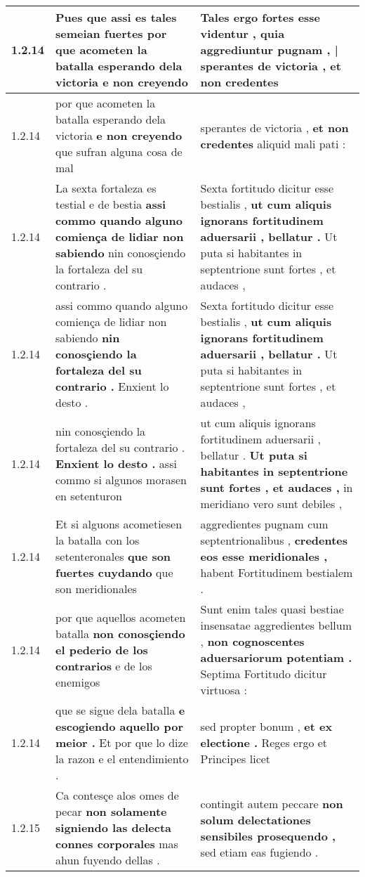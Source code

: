 \begin{tabular}{|p{1cm}|p{6.5cm}|p{6.5cm}|}
1.2.14 & Pues que assi es tales semeian fuertes \textbf{ por que acometen la batalla esperando dela victoria } e non creyendo & Tales ergo fortes esse videntur , \textbf{ quia aggrediuntur pugnam , | sperantes de victoria , } et non credentes \\\hline
1.2.14 & por que acometen la batalla esperando dela victoria \textbf{ e non creyendo } que sufran alguna cosa de mal & sperantes de victoria , \textbf{ et non credentes } aliquid mali pati : \\\hline
1.2.14 & La sexta fortaleza es testial e de bestia \textbf{ assi commo quando alguno comiença de lidiar non sabiendo } nin conosçiendo la fortaleza del su contrario . & Sexta fortitudo dicitur esse bestialis , \textbf{ ut cum aliquis ignorans fortitudinem aduersarii , bellatur . } Ut puta si habitantes in septentrione sunt fortes , et audaces , \\\hline
1.2.14 & assi commo quando alguno comiença de lidiar non sabiendo \textbf{ nin conosçiendo la fortaleza del su contrario . } Enxient lo desto . & Sexta fortitudo dicitur esse bestialis , \textbf{ ut cum aliquis ignorans fortitudinem aduersarii , bellatur . } Ut puta si habitantes in septentrione sunt fortes , et audaces , \\\hline
1.2.14 & nin conosçiendo la fortaleza del su contrario . \textbf{ Enxient lo desto . } assi commo si algunos morasen en setenturon & ut cum aliquis ignorans fortitudinem aduersarii , bellatur . \textbf{ Ut puta si habitantes in septentrione sunt fortes , et audaces , } in meridiano vero sunt debiles , \\\hline
1.2.14 & Et si alguons acometiesen la batalla con los setenteronales \textbf{ que son fuertes cuydando } que son meridionales & aggredientes pugnam cum septentrionalibus , \textbf{ credentes eos esse meridionales , } habent Fortitudinem bestialem . \\\hline
1.2.14 & por que aquellos acometen batalla \textbf{ non conosçiendo el pederio de los contrarios } e de los enemigos & Sunt enim tales quasi bestiae insensatae aggredientes bellum , \textbf{ non cognoscentes aduersariorum potentiam . } Septima Fortitudo dicitur virtuosa : \\\hline
1.2.14 & que se sigue dela batalla \textbf{ e escogiendo aquello por meior . } Et por que lo dize la razon e el entendimiento . & sed propter bonum , \textbf{ et ex electione . } Reges ergo et Principes licet \\\hline
1.2.15 & Ca contesçe alos omes de pecar \textbf{ non solamente signiendo las delecta connes corporales } mas ahun fuyendo dellas . & contingit autem peccare \textbf{ non solum delectationes sensibiles prosequendo , } sed etiam eas fugiendo . \\\hline

\end{tabular}
